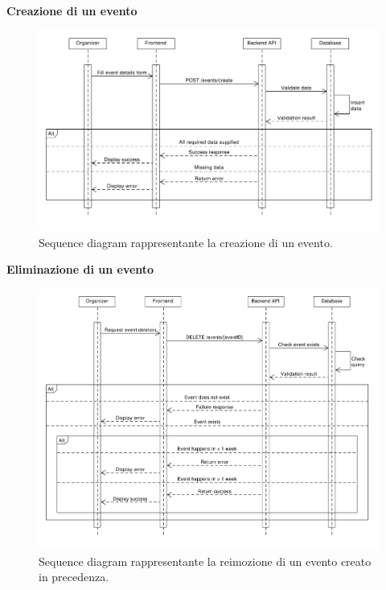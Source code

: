 \documentclass[9pt]{extarticle}
\begin{document}
\newpage\textbf{Creazione di un evento}
\begin{figure}[!htb]
	\centering
	\includegraphics[width=\linewidth]{./images/SequenceDiagramEventCreation.pdf}
	\caption{Sequence diagram rappresentante la creazione di un evento.}
	\label{fig:SeqDiagEventCreation}
\end{figure}

\newpage
\textbf{Eliminazione di un evento}
\begin{figure}[!htb]
	\centering
	\includegraphics[width=\linewidth]{./images/SequenceDiagramEventDeletion.pdf}
	\caption{Sequence diagram rappresentante la reimozione di un evento creato in precedenza.}
	\label{fig:SeqDiagEventDeletion}
\end{figure}
\end{document}
